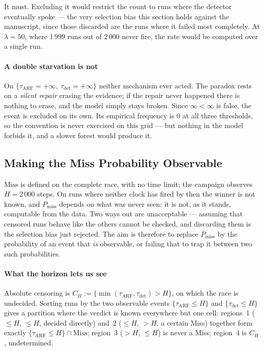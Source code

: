 \documentclass[10pt,conference]{IEEEtran}
\theoremstyle{definition}
\begin{document}
It must. Excluding it would restrict the count to runs where the detector eventually
spoke --- the very selection bias this section holds against the manuscript, since those
discarded are the runs where it failed most completely. At $\lambda = 50$, where $1\,999$
runs out of $2\,000$ never fire, the rate would be computed over a single run.

\paragraph{A double starvation is not} On
$\{\tau_{\mathrm{ARF}} = +\infty,\ \tau_{\mathrm{det}} = +\infty\}$ neither mechanism
ever acted. The paradox rests on a \emph{silent repair} erasing the evidence; if the
repair never happened there is nothing to erase, and the model simply stays broken. Since
$\infty < \infty$ is false, the event is excluded on its own. Its empirical frequency is
$0$ at all three thresholds, so the convention is never exercised on this grid --- but
nothing in the model forbids it, and a slower forest would produce it.

\begin{center}
\end{center}

\subsection{Making the Miss Probability Observable}

$\mathrm{Miss}$ is defined on the complete race, with no time limit; the campaign
observes $H = 2\,000$ steps. On runs where neither clock has fired by then the winner is
not known, and $P_{\mathrm{miss}}$ depends on what was never seen: it is not, as it
stands, computable from the data. Two ways out are unacceptable --- assuming that
censored runs behave like the others cannot be checked, and discarding them is the
selection bias just rejected. The aim is therefore to replace $P_{\mathrm{miss}}$ by the
probability of an event that \emph{is} observable, or failing that to trap it between two
such probabilities.

\paragraph{What the horizon lets us see} Absolute censoring is
$C_H := \{\min(\tau_{\mathrm{ARF}},\tau_{\mathrm{det}}) > H\}$, on which the race is
undecided. Sorting runs by the two observable events $\{\tau_{\mathrm{ARF}} \le H\}$ and
$\{\tau_{\mathrm{det}} \le H\}$ gives a partition where the verdict is known everywhere
but one cell: regions~1 ($\le H$, $\le H$, decided directly) and~2 ($\le H$, $>H$, a
certain Miss) together form exactly $\{\tau_{\mathrm{ARF}} \le H\} \cap \mathrm{Miss}$;
region~3 ($>H$, $\le H$) is never a Miss; region~4 is $C_H$, undetermined.
\end{document}
